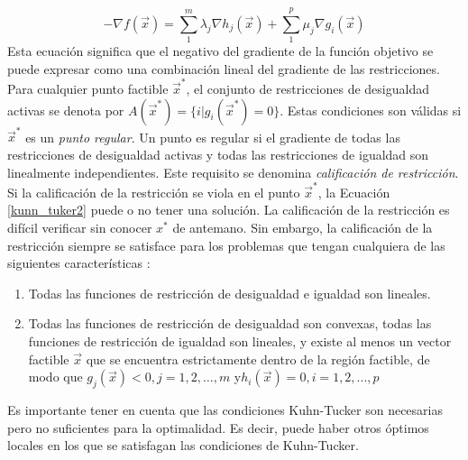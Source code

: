 \begin{equation}
-\nabla f(\vec{x})=  \sum_{1}^m \lambda_j  \nabla h_j(\vec{x})+ \sum_{1}^p \mu_j  \nabla g_i(\vec{x})
\label{kunn_tuker2}
\end{equation}
Esta ecuación significa que el negativo del gradiente de la función objetivo se puede expresar como una combinación lineal del gradiente de las restricciones. Para cualquier punto factible $\vec{x}^*$, el conjunto de restricciones de desigualdad activas se denota por $  A(\vec{x}^*) = \big\{  i|g_i(\vec{x}^*)=0 \big\} $.
Estas condiciones son válidas si $\vec{x}^*$ es un \textit{punto regular}. Un punto es regular si el gradiente de todas las restricciones de desigualdad activas y todas las restricciones de igualdad son linealmente independientes. Este requisito se denomina \textit{calificación de restricción}. Si la calificación de la restricción se viola en el punto $\vec{x}^*$, la Ecuación \ref{kunn_tuker2} puede o no tener una solución. La calificación de la restricción es difícil verificar sin conocer $\textit{x}^*$ de antemano. Sin embargo, la calificación de la restricción siempre se satisface para los problemas que tengan cualquiera de las siguientes características \cite{rao_engineering_2009}:
\begin{enumerate}
\item Todas las funciones de restricción de desigualdad e igualdad son lineales. 
\item Todas las funciones de restricción de desigualdad son convexas, todas las funciones de restricción de igualdad son lineales, y existe al menos un vector factible $\vec{x}$ que se encuentra estrictamente dentro de la región factible, de modo que $g_j(\vec{x}) < 0, j = 1,2,\ldots,m$ y$ h_i(\vec{x}) = 0, i = 1,2,...,p$
\end{enumerate}
Es importante tener en cuenta que las condiciones Kuhn-Tucker  son necesarias pero no suficientes para la optimalidad. Es decir, puede haber otros óptimos locales en los que se satisfagan las condiciones de Kuhn-Tucker. 

